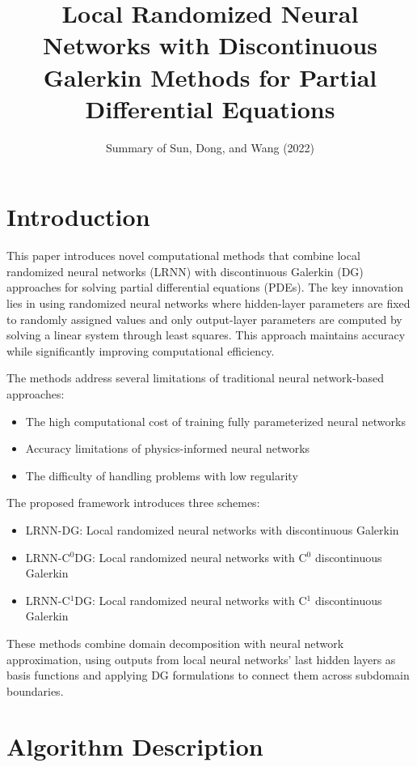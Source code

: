 \documentclass[11pt,a4paper]{article}
\title{Local Randomized Neural Networks with Discontinuous Galerkin Methods for Partial Differential Equations}
\author{Summary of Sun, Dong, and Wang (2022)}
\date{}
\begin{document}
\maketitle

\section{Introduction}

This paper introduces novel computational methods that combine local randomized neural networks (LRNN) with discontinuous Galerkin (DG) approaches for solving partial differential equations (PDEs). The key innovation lies in using randomized neural networks where hidden-layer parameters are fixed to randomly assigned values and only output-layer parameters are computed by solving a linear system through least squares. This approach maintains accuracy while significantly improving computational efficiency.

The methods address several limitations of traditional neural network-based approaches:
\begin{itemize}
    \item The high computational cost of training fully parameterized neural networks
    \item Accuracy limitations of physics-informed neural networks
    \item The difficulty of handling problems with low regularity
\end{itemize}

The proposed framework introduces three schemes:
\begin{itemize}
    \item LRNN-DG: Local randomized neural networks with discontinuous Galerkin
    \item LRNN-C$^0$DG: Local randomized neural networks with C$^0$ discontinuous Galerkin
    \item LRNN-C$^1$DG: Local randomized neural networks with C$^1$ discontinuous Galerkin
\end{itemize}

These methods combine domain decomposition with neural network approximation, using outputs from local neural networks' last hidden layers as basis functions and applying DG formulations to connect them across subdomain boundaries.

\section{Algorithm Description}
\end{document}
